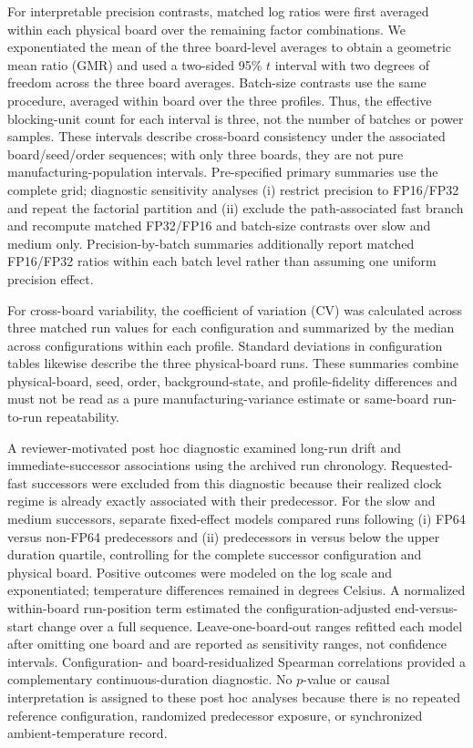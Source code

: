\documentclass[electronics,article,submit,pdftex,moreauthors]{Definitions/mdpi}
\begin{document}
For interpretable precision contrasts, matched log ratios were first averaged within each physical board over the remaining factor combinations. We exponentiated the mean of the three board-level averages to obtain a geometric mean ratio (GMR) and used a two-sided 95\% $t$ interval with two degrees of freedom across the three board averages. Batch-size contrasts use the same procedure, averaged within board over the three profiles. Thus, the effective blocking-unit count for each interval is three, not the number of batches or power samples. These intervals describe cross-board consistency under the associated board/seed/order sequences; with only three boards, they are not pure manufacturing-population intervals. Pre-specified primary summaries use the complete grid; diagnostic sensitivity analyses (i) restrict precision to FP16/FP32 and repeat the factorial partition and (ii) exclude the path-associated fast branch and recompute matched FP32/FP16 and batch-size contrasts over slow and medium only. Precision-by-batch summaries additionally report matched FP16/FP32 ratios within each batch level rather than assuming one uniform precision effect.

For cross-board variability, the coefficient of variation (CV) was calculated across three matched run values for each configuration and summarized by the median across configurations within each profile. Standard deviations in configuration tables likewise describe the three physical-board runs. These summaries combine physical-board, seed, order, background-state, and profile-fidelity differences and must not be read as a pure manufacturing-variance estimate or same-board run-to-run repeatability.

A reviewer-motivated post hoc diagnostic examined long-run drift and immediate-successor associations using the archived run chronology. Requested-fast successors were excluded from this diagnostic because their realized clock regime is already exactly associated with their predecessor. For the slow and medium successors, separate fixed-effect models compared runs following (i) FP64 versus non-FP64 predecessors and (ii) predecessors in versus below the upper duration quartile, controlling for the complete successor configuration and physical board. Positive outcomes were modeled on the log scale and exponentiated; temperature differences remained in degrees Celsius. A normalized within-board run-position term estimated the configuration-adjusted end-versus-start change over a full sequence. Leave-one-board-out ranges refitted each model after omitting one board and are reported as sensitivity ranges, not confidence intervals. Configuration- and board-residualized Spearman correlations provided a complementary continuous-duration diagnostic. No $p$-value or causal interpretation is assigned to these post hoc analyses because there is no repeated reference configuration, randomized predecessor exposure, or synchronized ambient-temperature record.
\end{document}
